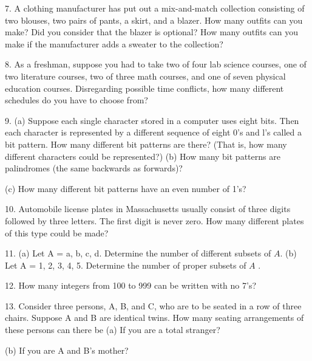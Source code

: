 \documentclass[10pt,]{book}
\theoremstyle{plain}
\theoremstyle{definition}
\begin{document}
\begin{exercisegroup}
\item[7.]\hypertarget{exercise-48}{} A clothing manufacturer has put out a mix-and-match collection consisting of two blouses, two pairs of pants, a skirt, and a blazer. How many outfits can you make? Did you consider that the blazer is optional? How many outfits can you make if the manufacturer adds a sweater to the collection?\par\smallskip
\item[8.]\hypertarget{exercise-49}{} As a freshman, suppose you had to take two of four lab science courses, one of two literature courses, two of three math courses, and one of seven physical education courses. Disregarding possible time conflicts, how many different schedules do you have to choose from?\par\smallskip
\item[9.]\hypertarget{exercise-50}{} (a) Suppose each single character stored in a computer uses eight bits. Then each character is represented by a different sequence of eight 0's and l's called a bit pattern. How many different bit patterns are there? (That is, how many different characters could be represented?)
 (b) How many bit patterns are palindromes (the same backwards as forwards)?%
\par
 (c) How many different bit patterns have an even number of 1's?%
\par\smallskip
\item[10.]\hypertarget{exercise-51}{} Automobile license plates in Massachusetts usually consist of three digits followed by three letters. The first digit is never zero. How many different plates of this type could be made?\par\smallskip
\item[11.]\hypertarget{exercise-52}{} (a) Let A = {a, b, c, d}. Determine the number of different subsets of \(A\). 
 (b) Let A = {1, 2, 3, 4, 5}. Determine the number of proper subsets of \(A\) .
%
\par\smallskip
\item[12.]\hypertarget{exercise-53}{} How many integers from 100 to 999 can be written with no 7's?\par\smallskip
\item[13.]\hypertarget{exercise-54}{} Consider three persons, A, B, and C, who are to be seated in a row of three chairs. Suppose A and B are identical twins. How many seating arrangements of these persons can there be
 (a) If you are a total stranger?%
\par
(b) If you are A and B's mother?%

\end{exercisegroup}
\end{document}
